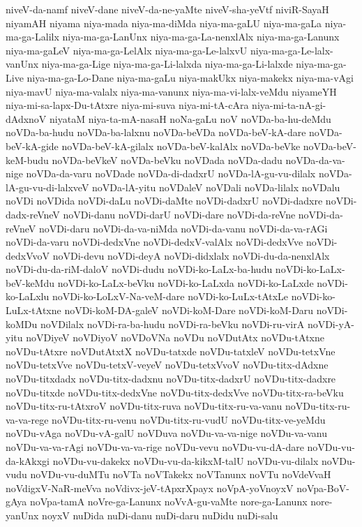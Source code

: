 {niveV-da-namf
niveV-dane
niveV-da-ne-yaMte
niveV-sha-yeVtf
niviR-SayaH
niyamAH
niyama
niya-mada
niya-ma-diMda
niya-ma-gaLU
niya-ma-gaLa
niya-ma-ga-Lalilx
niya-ma-ga-LanUnx
niya-ma-ga-La-nenxlAlx
niya-ma-ga-Lanunx
niya-ma-gaLeV
niya-ma-ga-LelAlx
niya-ma-ga-Le-lalxvU
niya-ma-ga-Le-lalx-vanUnx
niya-ma-ga-Lige
niya-ma-ga-Li-lalxda
niya-ma-ga-Li-lalxde
niya-ma-ga-Live
niya-ma-ga-Lo-Dane
niya-ma-gaLu
niya-makUkx
niya-makekx
niya-ma-vAgi
niya-mavU
niya-ma-valalx
niya-ma-vanunx
niya-ma-vi-lalx-veMdu
niyameYH
niya-mi-sa-lapx-Du-tAtxre
niya-mi-suva
niya-mi-tA-cAra
niya-mi-ta-nA-gi-dAdxnoV
niyataM
niya-ta-mA-nasaH
noNa-gaLu
noV
noVDa-ba-hu-deMdu
noVDa-ba-hudu
noVDa-ba-lalxnu
noVDa-beVDa
noVDa-beV-kA-dare
noVDa-beV-kA-gide
noVDa-beV-kA-gilalx
noVDa-beV-kalAlx
noVDa-beVke
noVDa-beV-keM-budu
noVDa-beVkeV
noVDa-beVku
noVDada
noVDa-dadu
noVDa-da-va-nige
noVDa-da-varu
noVDade
noVDa-di-dadxrU
noVDa-lA-gu-vu-dilalx
noVDa-lA-gu-vu-di-lalxveV
noVDa-lA-yitu
noVDaleV
noVDali
noVDa-lilalx
noVDalu
noVDi
noVDida
noVDi-daLu
noVDi-daMte
noVDi-dadxrU
noVDi-dadxre
noVDi-dadx-reVneV
noVDi-danu
noVDi-darU
noVDi-dare
noVDi-da-reVne
noVDi-da-reVneV
noVDi-daru
noVDi-da-va-niMda
noVDi-da-vanu
noVDi-da-va-rAGi
noVDi-da-varu
noVDi-dedxVne
noVDi-dedxV-valAlx
noVDi-dedxVve
noVDi-dedxVvoV
noVDi-devu
noVDi-deyA
noVDi-didxlalx
noVDi-du-da-nenxlAlx
noVDi-du-da-riM-daloV
noVDi-dudu
noVDi-ko-LaLx-ba-hudu
noVDi-ko-LaLx-beV-keMdu
noVDi-ko-LaLx-beVku
noVDi-ko-LaLxda
noVDi-ko-LaLxde
noVDi-ko-LaLxlu
noVDi-ko-LoLxV-Na-veM-dare
noVDi-ko-LuLx-tAtxLe
noVDi-ko-LuLx-tAtxne
noVDi-koM-DA-galeV
noVDi-koM-Dare
noVDi-koM-Daru
noVDi-koMDu
noVDilalx
noVDi-ra-ba-hudu
noVDi-ra-beVku
noVDi-ru-virA
noVDi-yA-yitu
noVDiyeV
noVDiyoV
noVDoVNa
noVDu
noVDutAtx
noVDu-tAtxne
noVDu-tAtxre
noVDutAtxtX
noVDu-tatxde
noVDu-tatxleV
noVDu-tetxVne
noVDu-tetxVve
noVDu-tetxV-veyeV
noVDu-tetxVvoV
noVDu-titx-dAdxne
noVDu-titxdadx
noVDu-titx-dadxnu
noVDu-titx-dadxrU
noVDu-titx-dadxre
noVDu-titxde
noVDu-titx-dedxVne
noVDu-titx-dedxVve
noVDu-titx-ra-beVku
noVDu-titx-ru-tAtxroV
noVDu-titx-ruva
noVDu-titx-ru-va-vanu
noVDu-titx-ru-va-va-rege
noVDu-titx-ru-venu
noVDu-titx-ru-vudU
noVDu-titx-ve-yeMdu
noVDu-vAga
noVDu-vA-galU
noVDuva
noVDu-va-va-nige
noVDu-va-vanu
noVDu-va-va-rAgi
noVDu-va-va-rige
noVDu-vevu
noVDu-vu-dA-dare
noVDu-vu-da-kAkxgi
noVDu-vu-dakekx
noVDu-vu-da-kikxM-talU
noVDu-vu-dilalx
noVDu-vudu
noVDu-vu-duMTu
noVTa
noVTakekx
noVTanunx
noVTu
noVdeVvaH
noVdigxV-NaR-meVva
noVdivx-jeV-tApxrXpayx
noVpA-yoVnoyxV
noVpa-BoV-gAya
noVpa-tamA
noVre-ga-Lanunx
noVvA-gu-vaMte
nore-ga-Lanunx
nore-yanUnx
noyxV
nuDida
nuDi-danu
nuDi-daru
nuDidu
nuDi-salu
}
